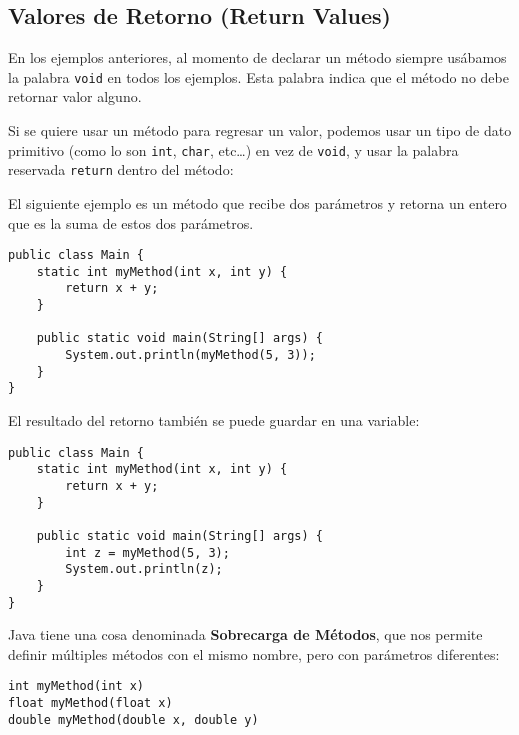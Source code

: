\documentclass[12pt]{article}
\newcounter{it}
\theoremstyle{largebreak}
\begin{document}
    \subsection{Valores de Retorno (Return Values)}

    En los ejemplos anteriores, al momento de declarar un método siempre usábamos la palabra \lstinline|void| en todos los ejemplos. Esta palabra indica que el método no debe retornar valor alguno.

    Si se quiere usar un método para regresar un valor, podemos usar un tipo de dato primitivo (como lo son \lstinline|int|, \lstinline|char|, etc\dots) en vez de \lstinline|void|, y usar la palabra reservada \lstinline|return| dentro del método:

    \begin{exa}
        El siguiente ejemplo es un método que recibe dos parámetros y retorna un entero que es la suma de estos dos parámetros.
        \begin{lstlisting}[caption={Ejemplo Método que Retorna \lstinline|int|.},label=DescriptiveLabel]
public class Main {
    static int myMethod(int x, int y) {
        return x + y;
    }

    public static void main(String[] args) {
        System.out.println(myMethod(5, 3));
    }
}
        \end{lstlisting}
        El resultado del retorno también se puede guardar en una variable:
        \begin{lstlisting}[caption={Ejemplo Método que Retorna \lstinline|int|.},label=DescriptiveLabel]
public class Main {
    static int myMethod(int x, int y) {
        return x + y;
    }

    public static void main(String[] args) {
        int z = myMethod(5, 3);
        System.out.println(z);
    }
}
        \end{lstlisting}
    \end{exa}

    \begin{obs}
        Java tiene una cosa denominada \textbf{Sobrecarga de Métodos}, que nos permite definir múltiples métodos con el mismo nombre, pero con parámetros diferentes:
        \begin{lstlisting}[caption={Sobrecarga de Métodos o Method Overloading.},label=DescriptiveLabel]
int myMethod(int x)
float myMethod(float x)
double myMethod(double x, double y)
        \end{lstlisting}
    \end{obs}
\end{document}
